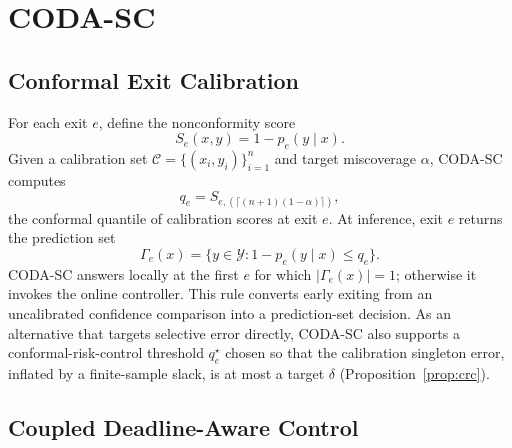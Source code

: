 \documentclass[11pt]{article}
\begin{document}
\section{CODA-SC}

\subsection{Conformal Exit Calibration}

For each exit $e$, define the nonconformity score
\begin{equation}
    S_e(x,y) = 1 - p_e(y\mid x).
\end{equation}
Given a calibration set $\mathcal{C}=\{(x_i,y_i)\}_{i=1}^{n}$ and target
miscoverage $\alpha$, CODA-SC computes
\begin{equation}
    q_e = S_{e,(\lceil (n+1)(1-\alpha)\rceil)},
\end{equation}
the conformal quantile of calibration scores at exit $e$. At inference, exit
$e$ returns the prediction set
\begin{equation}
    \Gamma_e(x) = \{y \in \mathcal{Y}: 1 - p_e(y\mid x) \leq q_e\}.
\end{equation}
CODA-SC answers locally at the first $e$ for which $|\Gamma_e(x)|=1$; otherwise
it invokes the online controller. This rule converts early exiting from an
uncalibrated confidence comparison into a prediction-set decision. As an
alternative that targets selective error directly, CODA-SC also supports a
conformal-risk-control threshold $q_e^{\star}$ chosen so that the calibration
singleton error, inflated by a finite-sample slack, is at most a target $\delta$
(Proposition~\ref{prop:crc}).

\subsection{Coupled Deadline-Aware Control}
\end{document}
